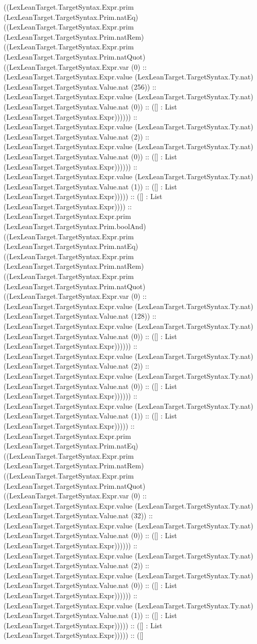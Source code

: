 \documentclass[11pt]{article}
\begin{document}
((LexLeanTarget.TargetSyntax.Expr.prim (LexLeanTarget.TargetSyntax.Prim.natEq) ((LexLeanTarget.TargetSyntax.Expr.prim (LexLeanTarget.TargetSyntax.Prim.natRem) ((LexLeanTarget.TargetSyntax.Expr.prim (LexLeanTarget.TargetSyntax.Prim.natQuot) ((LexLeanTarget.TargetSyntax.Expr.var (0) :: (LexLeanTarget.TargetSyntax.Expr.value (LexLeanTarget.TargetSyntax.Ty.nat) (LexLeanTarget.TargetSyntax.Value.nat (256)) :: (LexLeanTarget.TargetSyntax.Expr.value (LexLeanTarget.TargetSyntax.Ty.nat) (LexLeanTarget.TargetSyntax.Value.nat (0)) :: ([] : List (LexLeanTarget.TargetSyntax.Expr)))))) :: (LexLeanTarget.TargetSyntax.Expr.value (LexLeanTarget.TargetSyntax.Ty.nat) (LexLeanTarget.TargetSyntax.Value.nat (2)) :: (LexLeanTarget.TargetSyntax.Expr.value (LexLeanTarget.TargetSyntax.Ty.nat) (LexLeanTarget.TargetSyntax.Value.nat (0)) :: ([] : List (LexLeanTarget.TargetSyntax.Expr)))))) :: (LexLeanTarget.TargetSyntax.Expr.value (LexLeanTarget.TargetSyntax.Ty.nat) (LexLeanTarget.TargetSyntax.Value.nat (1)) :: ([] : List (LexLeanTarget.TargetSyntax.Expr))))) :: ([] : List (LexLeanTarget.TargetSyntax.Expr)))) :: (LexLeanTarget.TargetSyntax.Expr.prim (LexLeanTarget.TargetSyntax.Prim.boolAnd) ((LexLeanTarget.TargetSyntax.Expr.prim (LexLeanTarget.TargetSyntax.Prim.natEq) ((LexLeanTarget.TargetSyntax.Expr.prim (LexLeanTarget.TargetSyntax.Prim.natRem) ((LexLeanTarget.TargetSyntax.Expr.prim (LexLeanTarget.TargetSyntax.Prim.natQuot) ((LexLeanTarget.TargetSyntax.Expr.var (0) :: (LexLeanTarget.TargetSyntax.Expr.value (LexLeanTarget.TargetSyntax.Ty.nat) (LexLeanTarget.TargetSyntax.Value.nat (128)) :: (LexLeanTarget.TargetSyntax.Expr.value (LexLeanTarget.TargetSyntax.Ty.nat) (LexLeanTarget.TargetSyntax.Value.nat (0)) :: ([] : List (LexLeanTarget.TargetSyntax.Expr)))))) :: (LexLeanTarget.TargetSyntax.Expr.value (LexLeanTarget.TargetSyntax.Ty.nat) (LexLeanTarget.TargetSyntax.Value.nat (2)) :: (LexLeanTarget.TargetSyntax.Expr.value (LexLeanTarget.TargetSyntax.Ty.nat) (LexLeanTarget.TargetSyntax.Value.nat (0)) :: ([] : List (LexLeanTarget.TargetSyntax.Expr)))))) :: (LexLeanTarget.TargetSyntax.Expr.value (LexLeanTarget.TargetSyntax.Ty.nat) (LexLeanTarget.TargetSyntax.Value.nat (1)) :: ([] : List (LexLeanTarget.TargetSyntax.Expr))))) :: (LexLeanTarget.TargetSyntax.Expr.prim (LexLeanTarget.TargetSyntax.Prim.natEq) ((LexLeanTarget.TargetSyntax.Expr.prim (LexLeanTarget.TargetSyntax.Prim.natRem) ((LexLeanTarget.TargetSyntax.Expr.prim (LexLeanTarget.TargetSyntax.Prim.natQuot) ((LexLeanTarget.TargetSyntax.Expr.var (0) :: (LexLeanTarget.TargetSyntax.Expr.value (LexLeanTarget.TargetSyntax.Ty.nat) (LexLeanTarget.TargetSyntax.Value.nat (32)) :: (LexLeanTarget.TargetSyntax.Expr.value (LexLeanTarget.TargetSyntax.Ty.nat) (LexLeanTarget.TargetSyntax.Value.nat (0)) :: ([] : List (LexLeanTarget.TargetSyntax.Expr)))))) :: (LexLeanTarget.TargetSyntax.Expr.value (LexLeanTarget.TargetSyntax.Ty.nat) (LexLeanTarget.TargetSyntax.Value.nat (2)) :: (LexLeanTarget.TargetSyntax.Expr.value (LexLeanTarget.TargetSyntax.Ty.nat) (LexLeanTarget.TargetSyntax.Value.nat (0)) :: ([] : List (LexLeanTarget.TargetSyntax.Expr)))))) :: (LexLeanTarget.TargetSyntax.Expr.value (LexLeanTarget.TargetSyntax.Ty.nat) (LexLeanTarget.TargetSyntax.Value.nat (1)) :: ([] : List (LexLeanTarget.TargetSyntax.Expr))))) :: ([] : List (LexLeanTarget.TargetSyntax.Expr))))) :: ([] 
\end{document}
